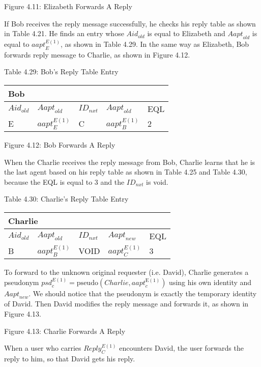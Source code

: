 Figure 4.11: Elizabeth Forwards A Reply

\noindent If Bob receives the reply message successfully, he checks his reply table as shown in Table 4.21. He finds an entry whose ${Aid}_{old}$ is equal to Elizabeth and ${Aapt}_{old}$ is equal to ${aapt}^{E\left(1\right)}_E$, as shown in Table 4.29. In the same way as Elizabeth, Bob forwards reply message to Charlie, as shown in Figure 4.12.

Table 4.29: Bob's Reply Table Entry

\begin{tabular}{|p{0.4in}|p{0.5in}|p{0.3in}|p{0.5in}|p{0.3in}|} \hline 
\multicolumn{5}{|p{1in}|}{Bob} \\ \hline 
${Aid}_{old}$ & ${Aapt}_{old}$ & ${ID}_{nxt}$ & ${Aapt}_{old}$ & EQL \\ \hline 
E & ${aapt}^{E\left(1\right)}_E$ & C & ${aapt}^{E\left(1\right)}_B$ & 2 \\ \hline 
\end{tabular}


Figure 4.12: Bob Forwards A Reply

\noindent When the Charlie receives the reply message from Bob, Charlie learns that he is the last agent based on his reply table as shown in Table 4.25 and Table 4.30, because the EQL is equal to 3 and the ${ID}_{nxt}$ is void.

\noindent 

Table 4.30: Charlie's Reply Table Entry

\begin{tabular}{|p{0.4in}|p{0.5in}|p{0.3in}|p{0.5in}|p{0.3in}|} \hline 
\multicolumn{5}{|p{1in}|}{Charlie} \\ \hline 
${Aid}_{old}$ & ${Aapt}_{old}$ & ${ID}_{nxt}$ & ${Aapt}_{new}$ & EQL \\ \hline 
B & ${aapt}^{E\left(1\right)}_B$ & VOID & ${aapt}^{E\left(1\right)}_C$ & 3 \\ \hline 
\end{tabular}



\noindent To forward to the unknown original requester (i.e. David), Charlie generates a pseudonym ${psd}^{E\left(1\right)}_c=\mathrm{pseudo}\left(Charlie,{aapt}^{\mathrm{E}\left(1\right)}_c\right)$ using his own identity and ${Aapt}_{new}$. We should notice that the pseudonym is exactly the temporary identity of David. Then David modifies the reply message and forwards it, as shown in Figure 4.13.

Figure 4.13: Charlie Forwards A Reply

\noindent When a user who carries ${Reply}^{E\left(1\right)}_C$ encounters David, the user forwards the reply to him, so that David gets his reply.

